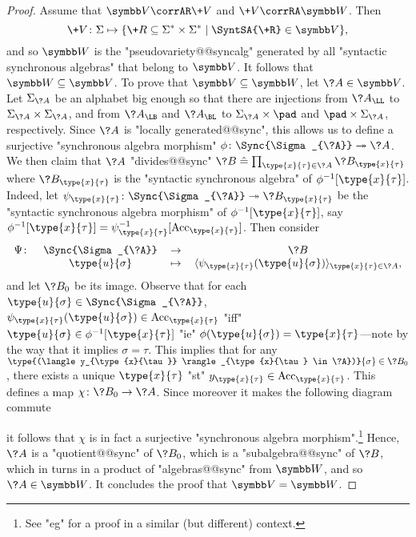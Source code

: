 \begin{proof}
	 Assume that $\B{V} \corrAR \+V$ and $\+V \corrRA \B{W}$.
	Then
	\[\+V\colon \Sigma \mapsto \{\+R \subseteq \Sigma^*\times \Sigma^* \mid \SyntSA{\+R} \in \B{V}\},\]
	and so $\B{W}$ is the "pseudovariety@@syncalg" generated by all "syntactic synchronous algebras" that 
	belong to $\B{V}$.
	It follows that $\B{W} \subseteq \B{V}$.
	To prove that $\B{V} \subseteq \B{W}$, let $\?A \in \B{V}$.
	Let $\Sigma_{\?A}$ be an alphabet big enough so that
	there are injections from $\?A_{\LL}$ to $\Sigma_{\?A}\times \Sigma_{\?A}$,
	and from $\?A_{\LB}$ and $\?A_{\BL}$ to $\Sigma_{\?A} \times \pad$ and $\pad \times \Sigma_{\?A}$,
	respectively. Since $\?A$ is "locally generated@@sync",
	this allows us to define a surjective "synchronous algebra morphism"
	$\phi\colon \Sync{\Sigma_{\?A}} \surj \?A$.
	We then claim that $\?A$ "divides@@sync"
	$\?B \defeq \prod_{\type{x}{\tau} \in \?A} \?B_{\type{x}{\tau}}$
	where $\?B_{\type{x}{\tau}}$ is the "syntactic synchronous algebra"
	of $\phi^{-1}[\type{x}{\tau}]$.
	Indeed, let $\psi_{\type{x}{\tau}} \colon \Sync{\Sigma_{\?A}} \surj \?B_{\type{x}{\tau}}$
	be the "syntactic synchronous algebra morphism" of $\phi^{-1}[\type{x}{\tau}]$, say
	$\phi^{-1}[\type{x}{\tau}] = \psi_{\type{x}{\tau}}^{-1}[\Acc_{\type{x}{\tau}}]$.
	Then consider
	\[\begin{tabular}{rccc}
		$\Psi\colon$ & $\Sync{\Sigma_{\?A}}$ & $\to$ & $\?B$ \\
		& $\type{u}{\sigma}$ & $\mapsto$ &
			$\langle \psi_{\type{x}{\tau}}(\type{u}{\sigma}) \rangle_{\type{x}{\tau} \in \?A}$,
	\end{tabular}\]
	and let $\?B_0$ be its image. Observe that for each $\type{u}{\sigma} \in \Sync{\Sigma_{\?A}}$,
	$\psi_{\type{x}{\tau}}(\type{u}{\sigma}) \in \Acc_{\type{x}{\tau}}$ "iff"
	$\type{u}{\sigma} \in \phi^{-1}[\type{x}{\tau}]$ "ie" $\phi(\type{u}{\sigma}) = \type{x}{\tau}$---note by the way that it implies $\sigma = \tau$.
	This implies that for any $\type{(\langle y_{\type{x}{\tau}} \rangle_{\type{x}{\tau} \in \?A})}{\sigma} \in \?B_0$, there exists a unique $\type{x}{\tau}$ "st"
	$y_{\type{x}{\tau}} \in \Acc_{\type{x}{\tau}}$. This defines a map
	$\chi\colon \?B_0 \to \?A$. Since moreover it makes the following diagram commute
	
	\begin{center}\end{center}
	it follows that $\chi$ is in fact a surjective "synchronous algebra morphism".\footnote{See "eg" \cite[Lemma 3.2, p.~10]{Bojanczyk2015Recognisable} for a proof in a similar (but different) context.} Hence, $\?A$ is a "quotient@@sync" of $\?B_0$, which is a "subalgebra@@sync" of
	$\?B$, which in turns in a product of "algebras@@sync" from $\B{W}$, and so $\?A \in \B{W}$.
	It concludes the proof that $\B{V} = \B{W}$.


\end{proof}
